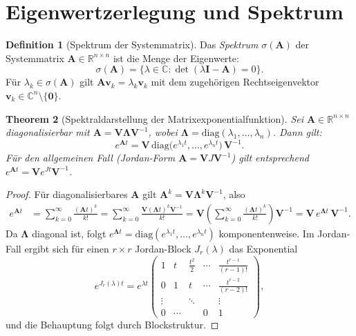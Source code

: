 ﻿\documentclass[12pt, a4paper, titlepage]{report}
\newtheorem{theorem}{Theorem}[section]
\theoremstyle{definition}
\newtheorem{definition}[theorem]{Definition}
\theoremstyle{remark}
\newcommand{\R}{\mathbb{R}}
\newcommand{\C}{\mathbb{C}}
\newcommand{\vA}{\bm{A}}
\newcommand{\vI}{\bm{I}}
\newcommand{\vV}{\bm{V}}
\newcommand{\vLambda}{\bm{\Lambda}}
\newcommand{\spec}{\sigma}
\newcommand{\diag}{\mathrm{diag}}
\begin{document}
\section{Eigenwertzerlegung und Spektrum}

\begin{definition}[Spektrum der Systemmatrix]
Das \emph{Spektrum} $\spec(\vA)$ der Systemmatrix $\vA \in \R^{n \times n}$ ist die
Menge der Eigenwerte:
\begin{equation}
  \spec(\vA) = \{\lambda \in \C : \det(\lambda\vI - \vA) = 0\}.
  \label{eq:spektrum}
\end{equation}
Für $\lambda_k \in \spec(\vA)$ gilt $\vA\bm{v}_k = \lambda_k\bm{v}_k$ mit dem zugehörigen
Rechtseigenvektor $\bm{v}_k \in \C^n \setminus \{\bm{0}\}$.
\end{definition}

\begin{theorem}[Spektraldarstellung der Matrixexponentialfunktion]
\label{thm:spektralexp}
Sei $\vA \in \R^{n \times n}$ diagonalisierbar mit $\vA = \vV\vLambda\vV^{-1}$,
wobei $\vLambda = \diag(\lambda_1, \ldots, \lambda_n)$. Dann gilt:
\begin{equation}
  e^{\vA t} = \vV\,\diag\!\bigl(e^{\lambda_1 t},\ldots,e^{\lambda_n t}\bigr)\,\vV^{-1}.
  \label{eq:spektralexp}
\end{equation}
Für den allgemeinen Fall (Jordan-Form $\vA = \vV J \vV^{-1}$) gilt entsprechend
$e^{\vA t} = \vV e^{Jt} \vV^{-1}$.
\end{theorem}

\begin{proof}
Für diagonalisierbares $\vA$ gilt $\vA^k = \vV\vLambda^k\vV^{-1}$, also
\begin{align*}
  e^{\vA t} &= \sum_{k=0}^\infty \frac{(\vA t)^k}{k!}
             = \sum_{k=0}^\infty \frac{\vV(\vLambda t)^k\vV^{-1}}{k!}
             = \vV\!\left(\sum_{k=0}^\infty \frac{(\vLambda t)^k}{k!}\right)\!\vV^{-1}
             = \vV\,e^{\vLambda t}\,\vV^{-1}.
\end{align*}
Da $\vLambda$ diagonal ist, folgt $e^{\vLambda t} = \diag(e^{\lambda_1 t}, \ldots, e^{\lambda_n t})$
komponentenweise. Im Jordan-Fall ergibt sich für einen $r \times r$ Jordan-Block
$J_r(\lambda)$ das Exponential
\[
  e^{J_r(\lambda)t} = e^{\lambda t}\begin{pmatrix}
    1 & t & \frac{t^2}{2} & \cdots & \frac{t^{r-1}}{(r-1)!} \\
    0 & 1 & t & \cdots & \frac{t^{r-2}}{(r-2)!} \\
    \vdots & & \ddots & & \vdots \\
    0 & \cdots & & 0 & 1
  \end{pmatrix},
\]
und die Behauptung folgt durch Blockstruktur. \qedhere
\end{proof}
\end{document}
